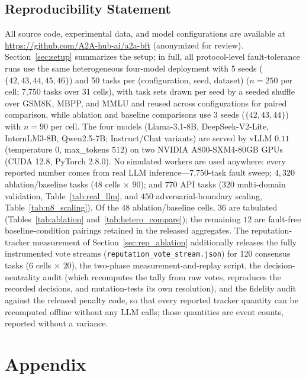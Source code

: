 \documentclass{article}
\begin{document}
\subsection*{Reproducibility Statement}
All source code, experimental data, and model configurations are available at \url{https://github.com/A2A-hub-ai/a2a-bft} (anonymized for review). Section~\ref{sec:setup} summarizes the setup; in full, all protocol-level fault-tolerance runs use the same heterogeneous four-model deployment with 5 seeds ($\{42, 43, 44, 45, 46\}$) and 50 tasks per (configuration, seed, dataset) ($n{=}250$ per cell; 7{,}750 tasks over 31 cells), with task sets drawn per seed by a seeded shuffle over GSM8K, MBPP, and MMLU and reused across configurations for paired comparison, while ablation and baseline comparisons use 3 seeds ($\{42, 43, 44\}$) with $n{=}90$ per cell. The four models (Llama-3.1-8B, DeepSeek-V2-Lite, InternLM3-8B, Qwen2.5-7B; Instruct/Chat variants) are served by vLLM \citep{vllm} $0.11$ (temperature $0$, max\_tokens $512$) on two NVIDIA A800-SXM4-80GB GPUs (CUDA 12.8, PyTorch 2.8.0). No simulated workers are used anywhere: every reported number comes from real LLM inference---7{,}750-task fault sweep; $4{,}320$ ablation/baseline tasks ($48$ cells $\times$ $90$); and $770$ API tasks ($320$ multi-domain validation, Table~\ref{tab:real_llm}, and $450$ adversarial-boundary scaling, Table~\ref{tab:n8_scaling}). Of the $48$ ablation/baseline cells, $36$ are tabulated (Tables~\ref{tab:ablation} and~\ref{tab:hetero_compare}); the remaining $12$ are fault-free baseline-condition pairings retained in the released aggregates. The reputation-tracker measurement of Section~\ref{sec:rep_ablation} additionally releases the fully instrumented vote streams (\texttt{reputation\_vote\_stream.json}) for 120 consensus tasks ($6$ cells $\times$ $20$), the two-phase measurement-and-replay script, the decision-neutrality audit (which recomputes the tally from raw votes, reproduces the recorded decisions, and mutation-tests its own resolution), and the fidelity audit against the released penalty code, so that every reported tracker quantity can be recomputed offline without any LLM calls; those quantities are event counts, reported without a variance.




\appendix
\section{Appendix}
\end{document}
